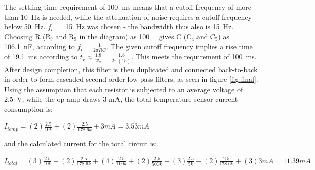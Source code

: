 The settling time requirement of \SI{100}{ms} means that a cutoff frequency of more than \SI{10}{Hz} is needed, while the attenuation of noise requires a cutoff frequency below \SI{50}{Hz}. $f_c = $ \SI{15}{Hz} was chosen - the bandwidth thus also is \SI{15}{Hz}. Choosing R ($\mathrm{R_7 \; and \; R_9}$ in the diagram) as \SI{100}{\kilo\Omega} gives C ($\mathrm{C_4 \; and \; C_5}$) as \SI{106.1}{nF}, according to $f_c=\frac{1}{2 \pi RC}$. The given cutoff frequency implies a rise time of \SI{19.1}{ms} according to $t_{r} \approx \frac{1.8}{w_{n}} = \frac{1.8}{2 \pi (15)}$\cite{cs}. This meets the requirement of \SI{100}{ms}. After design completion, this filter is then duplicated and connected back-to-back in order to form cascaded second-order low-pass filters, as seen in figure \ref{fig:final}.\\

Using the assumption that each resistor is subjected to an average voltage of \SI{2.5}{\volt}, while the op-amp draws 3 mA\cite{tlc}, the total temperature sensor current consumption is: 

$I_{temp} = (2)\frac{2.5}{10k} + (2)\frac{2.5}{178.6k} + 3mA = 3.53mA$

and the calculated current for the total circuit is:

$I_{total} = (3)\frac{2.5}{10k} + (2)\frac{2.5}{178.6k} + (4)\frac{2.5}{100k} + (2)\frac{2.5}{500k} + (3)\frac{2.5}{5k} + (2)\frac{2.5}{178.6k} + (3)3mA = 11.39mA$

 
